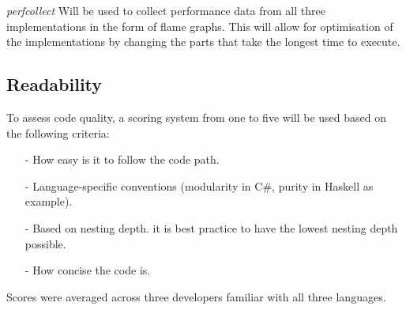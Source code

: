 \textit{perfcollect} Will be used to collect performance data from all three implementations in the
form of flame graphs. This will allow for optimisation of the implementations by changing the parts
that take the longest time to execute.

\subsection{Readability}
To assess code quality, a scoring system from one to five will be used based on the following criteria:

\begin{itemize}
    \item[-]  How easy is it to follow the code path.
    \item[-]  Language-specific conventions (modularity in C\#, purity in Haskell as example).
    \item[-]  Based on nesting depth. it is best practice to have the lowest nesting depth possible.
    \item[-]  How concise the code is.
\end{itemize}

Scores were averaged across three developers familiar with all three languages.
